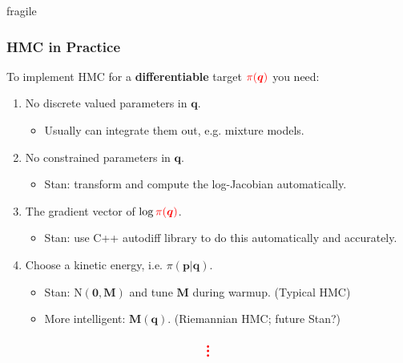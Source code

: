 \documentclass[xcolor=dvipsnames]{beamer}
\begin{document}
\begin{frame}{fragile}
\frametitle{HMC in Practice}
To implement HMC for a \textbf{differentiable} target ${\color{red}\pi(\bm{q})}$ you need:
\vspace{0.2cm}
\begin{enumerate}
\item No discrete valued parameters in $\bm{q}$.
\begin{itemize}
\item Usually can integrate them out, e.g. mixture models.
\end{itemize}
\vspace{0.2cm}
\item No constrained parameters in $\bm{q}$.
\begin{itemize}
\item Stan: transform and compute the log-Jacobian automatically.
\end{itemize}
\vspace{0.2cm}
\item The gradient vector of $\log {\color{red}\pi(\bm{q})}$.
\begin{itemize}
\item Stan: use C++ autodiff library to do this automatically and accurately.
\end{itemize}
\vspace{0.2cm}
\item Choose a kinetic energy, i.e. $\pi(\bm{p}|\bm{q})$.
\begin{itemize}
\item Stan: $\mathrm{N}(\bm{0}, \bm{M})$ and tune $\bm{M}$ during warmup. (Typical HMC)
\item More intelligent: $\bm{M}(\bm{q})$. (Riemannian HMC; future Stan?)
\end{itemize}
\end{enumerate}
\begin{align*}
{\color{red}\Huge{\vdots}}
\end{align*}
\end{frame}
\end{document}

